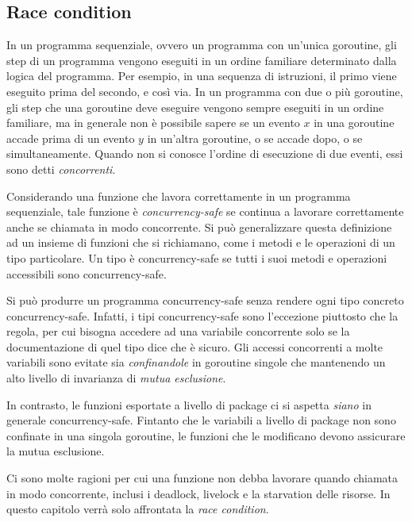 \documentclass[../../thesis.tex]{subfiles}
\begin{document}
    \subsection{Race condition}\label{subsec:race-condition}
    In un programma sequenziale, ovvero un programma con un'unica goroutine, gli step di un programma vengono eseguiti in un ordine familiare determinato dalla logica del programma.
    Per esempio, in una sequenza di istruzioni, il primo viene eseguito prima del secondo, e così via.
    In un programma con due o più goroutine, gli step che una goroutine deve eseguire vengono sempre eseguiti in un ordine familiare, ma in generale non è possibile sapere se un evento $x$ in una goroutine accade prima di un evento $y$ in un'altra goroutine, o se accade dopo, o se simultaneamente.
    Quando non si conosce l'ordine di esecuzione di due eventi, essi sono detti \textit{concorrenti}.
    \hfill \vspace{12pt}

    Considerando una funzione che lavora correttamente in un programma sequenziale, tale funzione è \textit{concurrency-safe} se continua a lavorare correttamente anche se chiamata in modo concorrente.
    Si può generalizzare questa definizione ad un insieme di funzioni che si richiamano, come i metodi e le operazioni di un tipo particolare.
    Un tipo è concurrency-safe se tutti i suoi metodi e operazioni accessibili sono concurrency-safe.
    \hfill \vspace{12pt}

    Si può produrre un programma concurrency-safe senza rendere ogni tipo concreto concurrency-safe.
    Infatti, i tipi concurrency-safe sono l'eccezione piuttosto che la regola, per cui bisogna accedere ad una variabile concorrente solo se la documentazione di quel tipo dice che è sicuro.
    Gli accessi concorrenti a molte variabili sono evitate sia \textit{confinandole} in goroutine singole che mantenendo un alto livello di invarianza di \textit{mutua esclusione}.
    \hfill \vspace{12pt}

    In contrasto, le funzioni esportate a livello di package ci si aspetta \textit{siano} in generale concurrency-safe.
    Fintanto che le variabili a livello di package non sono confinate in una singola goroutine, le funzioni che le modificano devono assicurare la mutua esclusione.
    \hfill \vspace{12pt}

    Ci sono molte ragioni per cui una funzione non debba lavorare quando chiamata in modo concorrente, inclusi i deadlock, livelock e la starvation delle risorse.
    In questo capitolo verrà solo affrontata la \textit{race condition}.
    \hfill \vspace{12pt}
\end{document}

